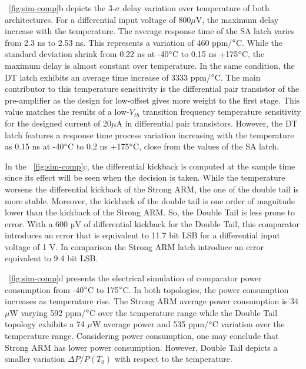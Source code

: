 \figurename~\ref{fig:sim-comp}b depicts the 3-\(\sigma \) delay variation over temperature of both architectures. For a differential input voltage of 800\(\mu \)V, the maximum delay increase with the temperature. The average response time of the SA latch varies from 2.3 ns to 2.53 ns. This represents a variation of 460 ppm/\(\degree \)C. While the standard deviation shrink from 0.22 ns at -40\(\degree \)C to 0.15 ns +175\(\degree \)C, the maximum delay is almost constant over temperature. In the same condition, the DT latch exhibits an average time increase of 3333 ppm/\(\degree \)C. The main contributor to this temperature sensitivity is the differential pair transistor of the pre-amplifier as the design for low-offset gives more weight to the first stage. This value matches the results of a low-\(V_{th} \) transition frequency temperature sensitivity for the designed current of 20\(\mu \)A in differential pair transistors. However, the DT latch features a response time process variation increasing with the temperature as  0.15 ns at -40\(\degree \)C to 0.2 ns +175\(\degree \)C, close from the values of the SA latch.

In the \figurename~\ref{fig:sim-comp}c, the differential kickback is computed at the sample time since its effect will be seen when the decision is taken. While the temperature worsens the differential kickback of the Strong ARM, the one of the double tail is more stable. Moreover, the kickback of the double tail is one order of magnitude lower than the kickback of the Strong ARM\@. So, the Double Tail is less prone to error. With a 600 µV of differential kickback for the Double Tail, this comparator introduces an error that is equivalent to 11.7 bit LSB for a differential input voltage of 1 V. In comparison the Strong ARM latch introduce an error equivalent to 9.4 bit LSB\@.

\figurename~\ref{fig:sim-comp}d presents the electrical simulation of comparator power consumption from -40\(\degree \)C to 175\(\degree \)C. In both topologies, the power consumption increases as temperature rise. The Strong ARM average power consumption is 34 \(\mu \)W varying 592 ppm/\(\degree \)C over the temperature range while the Double Tail topology exhibits a 74 \(\mu \)W average power and 535 ppm/\(\degree \)C variation over the temperature range. Considering power consumption, one may conclude that Strong ARM has lower power consumption. However, Double Tail depicts a smaller variation \(\Delta P/P(T_0)\) with respect to the temperature.

